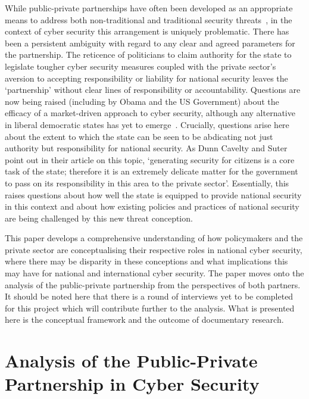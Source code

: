 \documentclass[a4paper,11pt]{article}
\begin{document}
While public-private partnerships have often been developed as an
appropriate means to address both non-traditional and traditional
security threats~\cite{manwaring:2002,usdoc:2012}, in the context of
cyber security this arrangement is uniquely problematic. There has
been a persistent ambiguity with regard to any clear and agreed
parameters for the partnership. The reticence of politicians to claim
authority for the state to legislate tougher cyber security measures
coupled with the private sector’s aversion to accepting responsibility
or liability for national security leaves the `partnership' without
clear lines of responsibility or accountability. Questions are now
being raised (including by Obama and the US Government) about the
efficacy of a market-driven approach to cyber security, although any
alternative in liberal democratic states has yet to
emerge~\cite{obama:2009}. Crucially, questions arise here about the
extent to which the state can be seen to be abdicating not just
authority but responsibility for national security. As Dunn Cavelty
and Suter~\cite{dunncavelty+suter:2009} point out in their article on
this topic, `generating security for citizens is a core task of the
state; therefore it is an extremely delicate matter for the government
to pass on its responsibility in this area to the private sector'.
Essentially, this raises questions about how well the state is
equipped to provide national security in this context and about how
existing policies and practices of national security are being
challenged by this new threat conception.

This paper develops a comprehensive understanding of how policymakers
and the private sector are conceptualising their respective roles in
national cyber security, where there may be disparity in these
conceptions and what implications this may have for national and
international cyber security. The paper moves onto the analysis of the
public-private partnership from the perspectives of both partners. It
should be noted here that there is a round of interviews yet to be
completed for this project which will contribute further to the
analysis. What is presented here is the conceptual framework and the
outcome of documentary research.

\section{Analysis of the Public-Private Partnership in Cyber Security}
\end{document}
